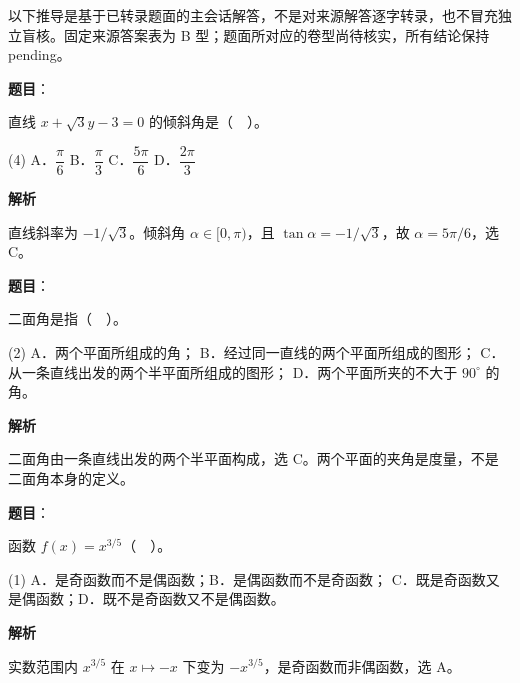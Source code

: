 

\begin{gktip}
以下推导是基于已转录题面的主会话解答，不是对来源解答逐字转录，也不冒充独立盲核。固定来源答案表为 B 型；题面所对应的卷型尚待核实，所有结论保持 pending。
\end{gktip}

\begin{answer}

\textbf{题目}：

直线 $x+\sqrt3y-3=0$ 的倾斜角是（　）。

\begin{gkopts}(4)
\task A．$\dfrac\pi6$
\task B．$\dfrac\pi3$
\task C．$\dfrac{5\pi}6$
\task D．$\dfrac{2\pi}3$
\end{gkopts}

\textbf{解析}

直线斜率为 $-1/\sqrt3$。倾斜角 $\alpha\in[0,\pi)$，且 $\tan\alpha=-1/\sqrt3$，故 $\alpha=5\pi/6$，选 C。


\end{answer}
\begin{answer}

\textbf{题目}：

二面角是指（　）。

\begin{gkopts}(2)
\task A．两个平面所组成的角；
\task B．经过同一直线的两个平面所组成的图形；
\task C．从一条直线出发的两个半平面所组成的图形；
\task D．两个平面所夹的不大于 $90^\circ$ 的角。
\end{gkopts}

\textbf{解析}

二面角由一条直线出发的两个半平面构成，选 C。两个平面的夹角是度量，不是二面角本身的定义。


\end{answer}
\begin{answer}

\textbf{题目}：

函数 $f(x)=x^{3/5}$（　）。

\begin{gkopts}(1)
\task A．是奇函数而不是偶函数；B．是偶函数而不是奇函数；
\task C．既是奇函数又是偶函数；D．既不是奇函数又不是偶函数。
\end{gkopts}

\textbf{解析}

实数范围内 $x^{3/5}$ 在 $x\mapsto -x$ 下变为 $-x^{3/5}$，是奇函数而非偶函数，选 A。


\end{answer}
